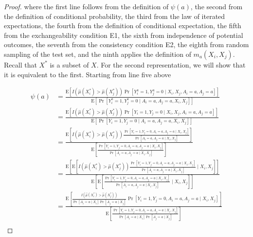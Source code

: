 \begin{proof}
where the first line follows from the definition of $\psi(a)$, the second from the definition of conditional probability, the third from the law of iterated expectations, the fourth from the definition of conditional expectation, the fifth from the exchangeability condition E1, the sixth from independence of potential outcomes, the seventh from the consistency condition E2, the eighth from random sampling of the test set, and the ninth applies the definition of $m_a(X_i, X_j)$. Recall that $X^*$ is a subset of $X$. For the second representation, we will show that it is equivalent to the first. Starting from line five above

$$
\begin{aligned}
\psi(a)&= \frac{\mathrm{E}\left[I\left(\widehat{\mu}(X_i^*)>\widehat{\mu}(X_j^*)\right) \operatorname{Pr}\left[Y^a_i=1, Y^a_j=0  \mid X_i, X_j, A_i = a, A_j = a\right]\right]}{\mathrm{E}\left[\operatorname{Pr}\left[Y^a_i=1, Y^a_j=0  \mid A_i = a, A_j = a, X_i, X_j\right]\right]} \\
&= \frac{\mathrm{E}\left[I\left(\widehat{\mu}(X_i^*)>\widehat{\mu}(X_j^*)\right) \operatorname{Pr}\left[Y_i=1, Y_j=0  \mid X_i, X_j, A_i = a, A_j = a\right]\right]}{\mathrm{E}\left[\operatorname{Pr}\left[Y_i=1, Y_j=0  \mid A_i = a, A_j = a, X_i, X_j\right]\right]} \\
&= \frac{\mathrm{E}\left[I\left(\widehat{\mu}(X_i^*)>\widehat{\mu}(X_j^*)\right) \frac{\operatorname{Pr}\left[Y_i=1, Y_j=0, A_i = a, A_j = a \mid X_i, X_j\right]}{\operatorname{Pr}\left[A_i = a, A_j = a \mid X_i, X_j\right]}\right]}{\mathrm{E}\left[\frac{\operatorname{Pr}\left[Y_i=1, Y_j=0, A_i = a, A_j = a \mid X_i, X_j\right]}{\operatorname{Pr}\left[A_i = a, A_j = a \mid X_i, X_j\right]}\right]} \\
&= \frac{\mathrm{E}\left[\mathrm{E}\left[I\left(\widehat{\mu}(X_i^*)>\widehat{\mu}(X_j^*)\right) \frac{\operatorname{Pr}\left[Y_i=1, Y_j=0, A_i = a, A_j = a \mid X_i, X_j\right]}{\operatorname{Pr}\left[A_i = a, A_j = a \mid X_i, X_j\right]} \mid X_i, X_j\right]\right]}{\mathrm{E}\left[\mathrm{E}\left[\frac{\operatorname{Pr}\left[Y_i=1, Y_j=0, A_i = a, A_j = a \mid X_i, X_j\right]}{\operatorname{Pr}\left[A_i=a, A_j = a \mid X_i, X_j\right]} \mid X_i, X_j\right]\right]} \\
&= \frac{\mathrm{E}\left[\frac{I\left(\widehat{\mu}(X_i^*)>\widehat{\mu}(X_j^*)\right)}{\operatorname{Pr}\left[A_i = a \mid X_i\right] \operatorname{Pr}\left[A_j = a \mid X_j\right]} \operatorname{Pr}\left[Y_i=1, Y_j=0, A_i = a, A_j = a \mid X_i, X_j\right]\right]}{\mathrm{E}\left[\frac{\operatorname{Pr}\left[Y_i=1, Y_j=0, A_i = a, A_j = a \mid X_i, X_j\right]}{\operatorname{Pr}[A_i = a \mid X_i] \Pr[A_j = a \mid X_j]}\right]} \\

\end{aligned}$$
\end{proof}
